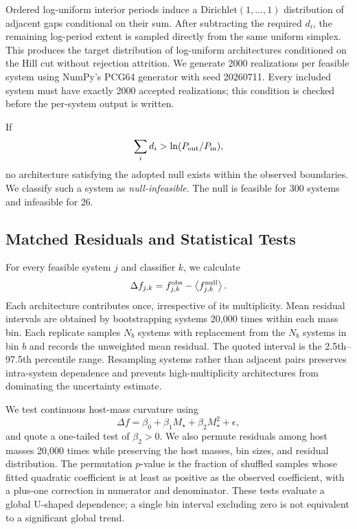 \documentclass[twocolumn,linenumbers]{aastex631}
\begin{document}
Ordered log-uniform interior periods induce a
$\mathrm{Dirichlet}(1,\ldots,1)$ distribution of adjacent gaps conditional on
their sum. After subtracting the required $d_i$, the remaining log-period
extent is sampled directly from the same uniform simplex. This produces the
target distribution of log-uniform architectures conditioned on the Hill cut
without rejection attrition. We generate 2000 realizations per feasible
system using NumPy's PCG64 generator with seed 20260711. Every included system
must have exactly 2000 accepted realizations; this condition is checked before
the per-system output is written.

If
\begin{equation}
\sum_i d_i>\ln(P_{\rm out}/P_{\rm in}),
\end{equation}
no architecture satisfying the adopted null exists within the observed
boundaries. We classify such a system as \emph{null-infeasible}. The null is
feasible for 300 systems and infeasible for 26.

\subsection{Matched Residuals and Statistical Tests}

For every feasible system $j$ and classifier $k$, we calculate
\begin{equation}
\Delta f_{j,k}=f_{j,k}^{\rm obs}-
\left\langle f_{j,k}^{\rm null}\right\rangle.
\end{equation}
Each architecture contributes once, irrespective of its multiplicity. Mean
residual intervals are obtained by bootstrapping systems 20,000 times within
each mass bin. Each replicate samples $N_b$ systems with replacement from the
$N_b$ systems in bin $b$ and records the unweighted mean residual. The quoted
interval is the 2.5th--97.5th percentile range. Resampling systems rather than
adjacent pairs preserves intra-system dependence and prevents high-multiplicity
architectures from dominating the uncertainty estimate.

We test continuous host-mass curvature using
\begin{equation}
\Delta f=\beta_0+\beta_1M_\star+\beta_2M_\star^2+\epsilon,
\end{equation}
and quote a one-tailed test of $\beta_2>0$. We also permute residuals among host
masses 20,000 times while preserving the host masses, bin sizes, and residual
distribution. The permutation $p$-value is the fraction of shuffled samples
whose fitted quadratic coefficient is at least as positive as the observed
coefficient, with a plus-one correction in numerator and denominator. These
tests evaluate a global U-shaped dependence; a single bin interval excluding
zero is not equivalent to a significant global trend.
\end{document}
